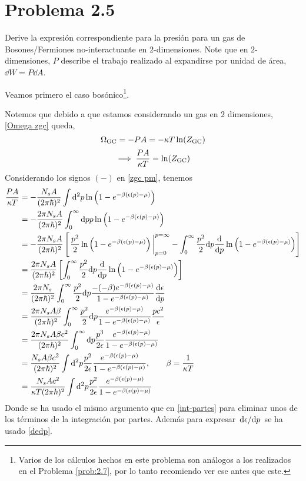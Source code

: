 \section{Problema 2.5}
\begin{tcolorbox}
\begin{problema}
	Derive la expresión correspondiente para la presión para un gas de   Bosones/Fermiones no-interactuante en $2$-dimensiones. Note que en $2$-dimensiones, $P$ describe el trabajo realizado al expandirse por unidad de área, $\dd W=P\dd A$.
\end{problema}
\end{tcolorbox}

\begin{sol}
	Veamos primero el caso bosónico\footnote{Varios de los cálculos hechos en este problema son análogos a los realizados en el Problema \ref{prob:2.7}, por lo tanto recomiendo ver ese antes que este. }.
	
	Notemos que debido a que estamos considerando un gas en $2$ dimensiones, \eqref{Omega zgc} queda,
\begin{equation}\label{Omega zgc}
  \Omega_{\rm GC}=-PA=-\kappa T\ln(Z_{\rm GC} )
\end{equation}
\begin{equation}
  \implies \frac{PA}{\kappa T}=\ln(Z_{\rm GC})
\end{equation}
Considerando los signos $(-)$ en \eqref{zgc pm}, tenemos
\begin{align}
	\frac{PA}{\k T}&=-\frac{N_sA}{(2\p\hbar)^2}\int \dd^2p\ln\left(1-e^{-\b(\epsilon(p)-\m )}\right)\\
	&=-\frac{2\p N_sA}{(2\p\hbar)^2}\int_0^\infty\dd p p\ln\left(1-e^{-\b(\epsilon(p)-\m )}\right)\\
	&=-\frac{2\p N_sA}{(2\p\hbar)^2}\left[\eval{\frac{p^2}{2}\ln\left(1-e^{-\b(\epsilon(p)-\m )}\right)}_{p=0}^{p=\infty} -\int_0^\infty\frac{p^2}{2}\dd p\dv{p}\ln\left(1-e^{-\b(\epsilon(p)-\m )}\right)\right]\\
	&=\frac{2\p N_sA}{(2\p\hbar)^2}\left[\int_0^\infty\frac{p^2}{2}\dd p\dv{p}\ln\left(1-e^{-\b(\epsilon(p)-\m )}\right)\right]\\
	&=\frac{2\p N_s}{(2\p\hbar)^2}\int_0^\infty\frac{p^2}{2}\dd p\frac{-(-\b  )e^{-\b(\epsilon(p)-\m )}}{1-e^{-\b(\epsilon(p)-\m )}}\dv{\epsilon}{p}\\
	&=\frac{2\p N_s A\b }{(2\p\hbar)^2}\int_0^\infty\frac{p^2}{2}\dd p\frac{e^{-\b(\epsilon(p)-\m )} }{1-e^{-\b(\epsilon(p)-\m )}}\frac{pc^2}{\epsilon}\\
	&=\frac{2\p N_s A\b c^2}{(2\p\hbar)^2}\int_0^\infty\dd p\frac{p^3}{2\epsilon}\frac{e^{-\b(\epsilon(p)-\m )}}{1-e^{-\b(\epsilon(p)-\m )}}\\
	&=\frac{N_s A\b c^2}{(2\p\hbar)^2}\int\dd^2p \frac{p^2}{2\epsilon}\frac{e^{-\b(\epsilon(p)-\m )}}{1-e^{-\b(\epsilon(p)-\m )}},\qquad \b=\frac{1}{\k T}\\
	&=\frac{N_s A c^2}{\k T(2\p\hbar)^2}\int\dd^2p \frac{p^2}{2\epsilon}\frac{e^{-\b(\epsilon(p)-\m )}}{1-e^{-\b(\epsilon(p)-\m )}}
\end{align}
Donde se ha usado el mismo argumento que en \eqref{int-partes} para eliminar unos de los términos de la integración por partes. Además para expresar $\dv*{\epsilon}{p}$ se ha usado \eqref{dedp}.


\end{sol}
